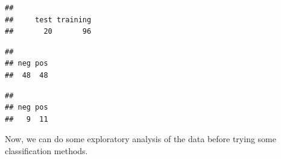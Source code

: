\documentclass[
]{article}
\newenvironment{Shaded}{\begin{snugshade}}{\end{snugshade}}
\newcommand{\CommentTok}[1]{\textcolor[rgb]{0.56,0.35,0.01}{\textit{#1}}}
\newcommand{\FunctionTok}[1]{\textcolor[rgb]{0.13,0.29,0.53}{\textbf{#1}}}
\newcommand{\NormalTok}[1]{#1}
\newcommand{\OtherTok}[1]{\textcolor[rgb]{0.56,0.35,0.01}{#1}}
\newcommand{\SpecialCharTok}[1]{\textcolor[rgb]{0.81,0.36,0.00}{\textbf{#1}}}
\newcommand{\StringTok}[1]{\textcolor[rgb]{0.31,0.60,0.02}{#1}}
\begin{document}
\begin{verbatim}
## 
##     test training 
##       20       96
\end{verbatim}

\begin{Shaded}
\end{Shaded}

\begin{Shaded}
\end{Shaded}

\begin{verbatim}
## 
## neg pos 
##  48  48
\end{verbatim}

\begin{Shaded}
\end{Shaded}

\begin{verbatim}
## 
## neg pos 
##   9  11
\end{verbatim}

Now, we can do some exploratory analysis of the data before trying some
classification methods.
\end{document}
